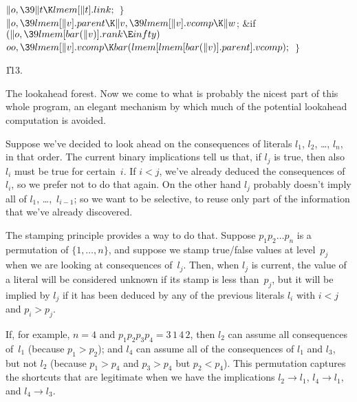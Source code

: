 ${}\|o,\39\|t\K\\{lmem}[\|t].\\{link};{}$\6
\4${}\}{}$\2\6
${}\|o,\39\\{lmem}[\|v].\\{parent}\K\|v,\39\\{lmem}[\|v].\\{vcomp}\K\|w{}$;\6
\&{if} ${}(\|o,\39\\{lmem}[\\{bar}(\|v)].\\{rank}\E\\{infty}){}$\1\5
${}\\{oo},\39\\{lmem}[\|v].\\{vcomp}\K\\{bar}(\\{lmem}[\\{lmem}[\\{bar}(\|v)].%
\\{parent}].\\{vcomp});{}$\2\6
\4${}\}{}$\2\par
\U113.\fi

The lookahead forest.
Now we come to what is probably the nicest part of this whole program,
an elegant mechanism by which much of the potential lookahead computation
is avoided.

Suppose we've decided to look ahead on the consequences of literals
$l_1$, $l_2$, \dots, $l_n$, in that order. The current binary implications
tell us that, if $l_j$ is true, then also $l_i$ must be true for certain~$i$.
If $i<j$, we've already deduced the consequences of $l_i$, so we prefer
not to do that again. On the other hand $l_j$ probably doesn't imply
all of $l_1$, \dots,~$l_{i-1}$; so we want to be selective, to reuse
only part of the information that we've already discovered.

The stamping principle provides a way to do that. Suppose $p_1p_2\ldots p_n$
is a permutation of $\{1,\ldots,n\}$, and suppose we stamp true/false values
at level~$p_j$ when we are looking at consequences of~$l_j$. Then, when
$l_j$ is current, the value of a literal will be considered unknown if its
stamp is less than~$p_j$, but it will be implied by $l_j$ if it has been
deduced by any of the previous literals $l_i$ with $i<j$ and $p_i>p_j$.

If, for example, $n=4$ and $p_1p_2p_3p_4=3\,1\,4\,2$, then $l_2$
can assume all consequences of~$l_1$ (because $p_1>p_2$); and $l_4$ can
assume all of the consequences of $l_1$ and $l_3$, but not $l_2$
(because $p_1>p_4$ and $p_3>p_4$ but $p_2<p_4$). This permutation
captures the shortcuts that are legitimate when we have the
implications $l_2\to l_1$, $l_4\to l_1$, and $l_4\to l_3$.


